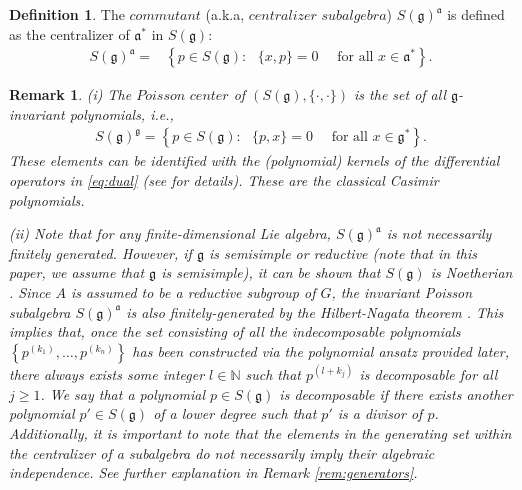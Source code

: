 \documentclass[11pt,reqno]{amsart}
\newtheorem*{theorem A}{Main Theorem A}
\newtheorem*{theorem B}{Main Theorem B}
\newtheorem*{theorem C}{Main Theorem C}
\newtheorem*{theorem D}{Main Theorem D}
\theoremstyle{definition}
\newtheorem{definition}[theorem]{Definition}
\theoremstyle{plain}
\newtheorem{remark}[theorem]{Remark}
\theoremstyle{conclusion}
\begin{document}
\begin{definition}
\label{def:pocen}
 The $\textit{commutant}$ (a.k.a, $\textit{centralizer subalgebra}$) $ S(\mathfrak{g})^\mathfrak{a}$ is defined as the centralizer of $\mathfrak{a}^*$ in $S(\mathfrak{g})$:
\begin{align*}
      S(\mathfrak{g})^\mathfrak{a}   =& \left\{p \in S(\mathfrak{g}): \text{ } \{x,p\} = 0  \quad \text{ for all } x \in \mathfrak{a}^*\right\}.
  \end{align*} %
\end{definition}
\begin{remark}
\label{2.2}
 (i) The $\textit{Poisson center}$ of $\left(S(\mathfrak{g}),\{\cdot,\cdot\}\right)$ is the set of all $\mathfrak{g}$-invariant polynomials, i.e., \begin{align*}
    S(\mathfrak{g})^\mathfrak{g}  =\left\{ p \in S(\mathfrak{g}) : \text{ } \{p,x\} = 0 \quad \text{ for all } x \in \mathfrak{g}^*\right\}.
\end{align*} These elements can be identified with the (polynomial) kernels of the differential operators in \eqref{eq:dual}  (see \cite{MR4355741,MR1451138} for details). These are the classical Casimir polynomials. 

 (ii) Note that for any finite-dimensional Lie algebra,  $S(\mathfrak{g})^\mathfrak{a}$ is not necessarily finitely generated. However, if $\mathfrak{g}$ is semisimple or reductive (note that in this paper, we assume that $\mathfrak{g}$ is semisimple), it can be shown that $S(\mathfrak{g})$ is Noetherian \cite[Chapter 2]{MR1451138}. Since $A$ is assumed to be a reductive subgroup of $G$, the invariant Poisson subalgebra $S(\mathfrak{g})^\mathfrak{a}$ is also finitely-generated by the Hilbert-Nagata theorem \cite[Theorem 6.1]{Dolgachev03}. This implies that, once the set consisting of all the indecomposable polynomials $\left\{p^{(k_1)},\dots ,p^{(k_n)}\right\}$ has been constructed via the polynomial ansatz provided later, there always exists some integer $l \in \mathbb{N}$ such that $p^{(l+k_j)}$ is \textit{decomposable} for all $j \geq 1$. We say that a polynomial $p \in S(\mathfrak{g})$ is decomposable if there exists another polynomial $p' \in S(\mathfrak{g})$ of a lower degree such that $p'$ is a divisor of $p$. Additionally, it is important to note that the elements in the generating set within the centralizer of a subalgebra do not necessarily imply their algebraic independence. See further explanation in Remark \ref{rem:generators}. %
\end{remark}
 
\end{document}
